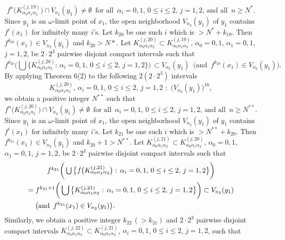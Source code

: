 \documentclass[12pt]{article}
\newcommand{\al}{\alpha}
\begin{document}
$$
f^n\big(K_{\al_0\al_1\al_2}^{(j,19)}\big) \cap V_{n_2}(y_1) \ne \emptyset \,\,\, \text{for all} \,\,\, \al_i = 0, 1, \, 0 \le i \le 2, \, j = 1, 2, \, \text{and all} \,\,\, n \ge N^*.
$$
\indent Since $y_1$ is an $\omega$-limit point of $x_1$, the open neighborhood $V_{n_2}(y_1)$ of $y_1$ contains $f^i(x_1)$ for infinitely many $i$'s.  Let $k_{20}$ be one such $i$ which is $> N^*+k_{19}$.  Then $f^{k_{20}}(x_1) \in V_{n_2}(y_1)$ and $k_{20} > N*$. Let $K_{\al_0\al_1\al_2}^{(j,20)} \subset K_{\al_0\al_1\al_2}^{(j,19)}$, $\al_0 = 0, 1$, $\al_1 = 0, 1$, $j = 1, 2$, be $2 \cdot 2^3$ pairwise disjoint compact intervals such that 
$$
f^{k_{20}}\bigg(\bigcup \big\{ K_{\al_0\al_1\al_2}^{(j,20)}: \, \al_i = 0, 1, \, 0 \le i \le 2, \, j = 1, 2 \big\}\bigg) \, \subset V_{n_2}(y_1) \,\,\, \big(\text{and} \,\,\, f^{k_{20}}(x_1) \in V_{n_2}(y_1)\big).
$$
\indent By applying Theorem 6(2) to the following $2(2 \cdot 2^3)$ intervals 
$$
K_{\al_0\al_1\al_2}^{(j,20)}, \, \al_i = 0, 1, \, 0 \le i \le 2, \, j = 1, 2 \,\, : \,\, \big(V_{n_2}(y_1)\big)^{16},
$$
we obtain a positive integer $N^{**}$ such that 
$$
f^n\big(K_{\al_0\al_1\al_2}^{(j,20)}\big) \cap V_{n_2}(y_1) \ne \emptyset \,\,\, \text{for all} \,\,\, \al_i = 0, 1, \, 0 \le i \le 2, \, j = 1, 2, \, \text{and all} \,\,\, n \ge N^{**}. 
$$
\indent Since $y_1$ is an $\omega$-limit point of $x_1$, the open neighborhood $V_{n_2}(y_1)$ of $y_1$ contains $f^i(x_1)$ for infinitely many $i$'s.  Let $k_{21}$ be one such $i$ which is $> N^{**}+k_{20}$.  Then $f^{k_{21}}(x_1) \in V_{n_2}(y_1)$ and $k_{20}+1 > N^{**}$. Let $K_{\al_0\al_1\al_2}^{(j,21)} \subset K_{\al_0\al_1\al_2}^{(j,20)}$, $\al_0 = 0, 1$, $\al_1 = 0, 1$, $j = 1, 2$, be $2 \cdot 2^3$ pairwise disjoint compact intervals such that 
\begin{multline*}
$$
f^{k_{21}}\bigg(\bigcup \big\{ f\big(K_{\al_0\al_1\al_2}^{(j,21)}\big): \, \al_i = 0, 1, \, 0 \le i \le 2, \, j = 1, 2 \big\}\bigg) \\
= f^{k_{21}+1}\bigg(\bigcup \big\{ K_{\al_0\al_1\al_2}^{(j,21)}: \, \al_i = 0, 1, \, 0 \le i \le 2, \, j = 1, 2 \big\}\bigg) \subset V_{n_2}(y_1) \\ 
\big(\text{and} \,\,\, f^{k_{21}}(x_1) \in V_{n_2}(y_1)\big).\qquad\qquad\qquad\qquad\qquad\qquad\qquad\qquad
$$
\end{multline*}
\indent Similarly, we obtain a positive integer $k_{22} \, (> k_{21})$ and $2 \cdot 2^3$ pairwise disjoint compact intervals $K_{\al_0\al_1\al_2}^{(j,22)} \subset K_{\al_0\al_1\al_2}^{(j,21)}$, $\al_i = 0, 1$, $0 \le i \le 2$, $j = 1, 2$, such that 
\end{document}
